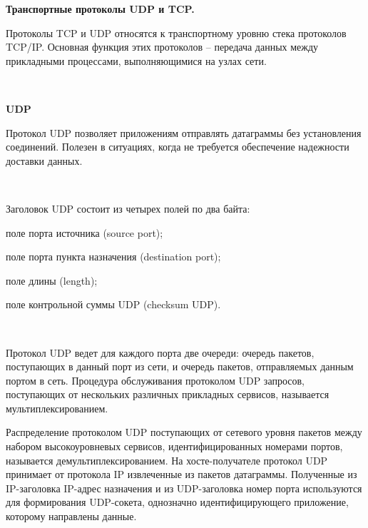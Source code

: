 \documentclass{article}
\begin{document}
\newpage

\textbf{\large Транспортные протоколы UDP и TCP.}

Протоколы TCP и UDP относятся к транспортному уровню стека протоколов TCP/IP.
Основная функция этих протоколов – передача данных между прикладными
процессами, выполняющимися на узлах сети.

~\

\textbf{UDP}

Протокол UDP позволяет приложениям отправлять датаграммы без установления соединений. 
Полезен в ситуациях, когда не требуется обеспечение надежности доставки данных. 

~\

Заголовок UDP состоит из четырех полей по два байта:
\begin{compactitem}
\item  поле порта источника (source port);
\item поле порта пункта назначения (destination port);
\item поле длины (length);
\item поле контрольной суммы UDP (checksum UDP).
\end{compactitem}

~\

Протокол UDP ведет для каждого порта две очереди: очередь пакетов, поступающих в данный порт из сети, и очередь пакетов, отправляемых данным портом в сеть. 
Процедура обслуживания протоколом UDP запросов, поступающих от нескольких различных прикладных сервисов, называется мультиплексированием. 

Распределение протоколом UDP поступающих от сетевого уровня пакетов между набором высокоуровневых сервисов, идентифицированных номерами портов, называется демультиплексированием. На хосте-получателе протокол UDP принимает от протокола IP извлеченные из пакетов датаграммы. Полученные из IP-заголовка IP-адрес назначения и из UDP-заголовка номер порта используются для формирования UDP-сокета, однозначно идентифицирующего приложение, которому направлены данные. 
\begin{figure}[h]
\end{figure}
~\
\end{document}
